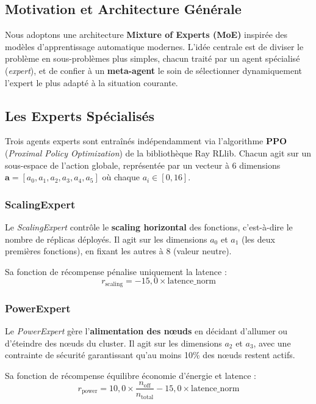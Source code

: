 
\subsection{Motivation et Architecture Générale}

Nous adoptons une architecture
\textbf{Mixture of Experts (MoE)} inspirée des modèles d'apprentissage
automatique modernes. L'idée centrale est de diviser le problème en
sous-problèmes plus simples, chacun traité par un agent spécialisé
(\textit{expert}), et de confier à un \textbf{meta-agent} le soin de
sélectionner dynamiquement l'expert le plus adapté à la situation courante.

\subsection{Les Experts Spécialisés}

Trois agents experts sont entraînés indépendamment via l'algorithme
\textbf{PPO} (\textit{Proximal Policy Optimization}) de la bibliothèque
Ray RLlib. Chacun agit sur un sous-espace de l'action globale, représentée
par un vecteur à 6 dimensions $\mathbf{a} = [a_0, a_1, a_2, a_3, a_4, a_5]$
où chaque $a_i \in [0, 16]$.

\subsubsection{ScalingExpert}

Le \textit{ScalingExpert} contrôle le \textbf{scaling horizontal} des
fonctions, c'est-à-dire le nombre de réplicas déployés. Il agit sur les
dimensions $a_0$ et $a_1$ (les deux premières fonctions), en fixant les
autres à 8 (valeur neutre).

Sa fonction de récompense pénalise uniquement la latence :
\[
r_{\text{scaling}} = -15{,}0 \times \text{latence\_norm}
\]

\subsubsection{PowerExpert}

Le \textit{PowerExpert} gère l'\textbf{alimentation des nœuds} en décidant
d'allumer ou d'éteindre des nœuds du cluster. Il agit sur les dimensions
$a_2$ et $a_3$, avec une contrainte de sécurité garantissant qu'au moins
10\% des nœuds restent actifs.

Sa fonction de récompense équilibre économie d'énergie et latence :
\[
r_{\text{power}} = 10{,}0 \times \frac{n_{\text{off}}}{n_{\text{total}}}
                 - 15{,}0 \times \text{latence\_norm}
\]

